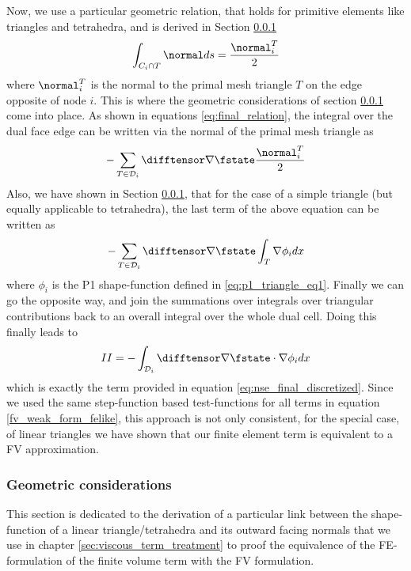 \documentclass[../main.tex]{subfiles}
\begin{document}
Now, we use a particular geometric relation, that holds for primitive elements like triangles and tetrahedra, and is  derived in Section \ref{sec:geometric_considerations}
\begin{align}
  \int_{C_i\cap T} \normal ds = \frac{\normal_i^T}{2}
\end{align}
where $\normal_i^T$ is the normal to the primal mesh triangle $T$ on the edge opposite of node $i$.
This is where the geometric considerations of section \ref{sec:geometric_considerations} come into place. As shown in equations \eqref{eq:final_relation}, the integral over the dual face edge can be written via the normal of the primal mesh triangle as
\begin{align}
  -\sum_{T\in\mathcal{D}_i} \difftensor \nabla\fstate \frac{\normal_i^T}{2}
\end{align}
Also, we have shown in Section \ref{sec:geometric_considerations}, that for the case of a simple triangle (but equally applicable to tetrahedra), the last term of the above equation can be written as
\begin{align}
  -\sum_{T\in\mathcal{D}_i} \difftensor \nabla\fstate \int_T \nabla \phi_i dx
\end{align}
where $\phi_i$ is the P1 shape-function defined in \eqref{eq:p1_triangle_eq1}.
Finally we can go the opposite way, and join the summations over integrals over triangular contributions back to an overall integral over the whole dual cell. Doing this finally leads to
\begin{align}
  II = -\int_{\mathcal{D}_i} \difftensor \nabla\fstate\cdot\nabla \phi_i dx
\end{align}
which is exactly the term provided in equation \eqref{eq:nse_final_discretized}.
Since we used the same step-function based test-functions for all terms in equation \eqref{fv_weak_form_felike}, this approach is not only consistent, for the special case, of linear triangles we have shown that our finite element term is equivalent to a FV approximation.



\subsubsection{Geometric considerations}\label{sec:geometric_considerations}
This section is dedicated to the derivation of a particular link between the shape-function of a linear triangle/tetrahedra and its outward facing normals that we use in chapter \ref{sec:viscous_term_treatment} to proof the equivalence of the FE-formulation of the finite volume term with the \ac{FV} formulation.
\end{document}
